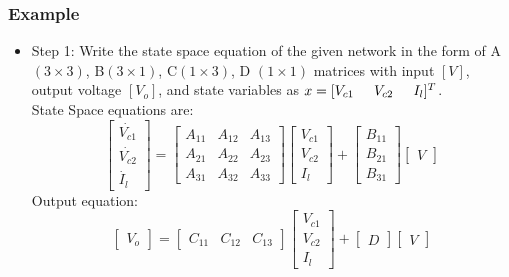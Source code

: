 \documentclass{beamer}
\begin{document}
\begin{frame}
\frametitle{Example}
\begin{small}
\begin{itemize}
\item Step 1: Write the state space equation of the given network in the form of A $(3 \times 3)$, B$(3 \times 1)$, C$(1 \times 3)$, D $(1 \times 1)$ matrices with input $[V]$, output voltage $ [V_o]$, and state variables as $x=[V_{c1} \hspace{.2in} V_{c2} \hspace{.2in}I_l]^T$.\\

State Space equations are:
\[ \left[ \begin{array}{cc}
\dot{V_{c1}} \\
\dot{V_{c2}} \\
\dot{I_l}
\end{array} \right]
=
\left[ \begin{array}{ccc}
A_{11} & A_{12} & A_{13}\\
A_{21} & A_{22} & A_{23}\\
A_{31} & A_{32} & A_{33}
\end{array} \right]
%
\left[ \begin{array}{c}
{V_{c1}} \\
{V_{c2}} \\
{I_l}
\end{array} \right]
+
\left[ \begin{array}{c}
B_{11} \\
B_{21} \\
B_{31}
\end{array} \right]
%
\left[ \begin{array}{c}
{V}
\end{array} \right]
\]
Output equation:
\[ \left[ \begin{array}{c}
{V_o} 
\end{array} \right]
=
\left[ \begin{array}{ccc}
C_{11} & C_{12} & C_{13}
\end{array} \right]
%
\left[ \begin{array}{cc}
{V_{c1}} \\
{V_{c2}}\\
{I_l}
\end{array} \right]
+
\left[ \begin{array}{cc}
D
\end{array} \right]
%
\left[ \begin{array}{cc}
{V}
\end{array} \right]
\]

\end{itemize}
\end{small}
\end{frame}
\end{document}

